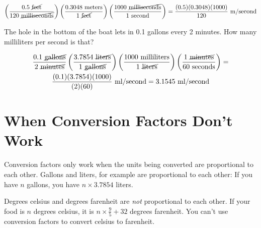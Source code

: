 \begin{multline*}
\left(\frac{0.5 \text{ \cancel{feet}}}{120 \text{ \cancel{milliseconds}}}\right) \left( \frac{0.3048 \text{ meters}}{1 \text{ \cancel{feet}}} \right) \left( \frac{ 1000 \text{ \cancel{milliseconds}}} {1 \text{ second}}\right) = \frac{(0.5)(0.3048)(1000)}{120}\text{ m/second}
\end{multline*}

\begin{Exercise}[title={Conversion Factors}, label=conversion_factors]

The hole in the bottom of the boat lets in 0.1 gallons every 2 minutes.  How many milliliters per second is that?
  
\end{Exercise}
\begin{Answer}[ref=onversion_factors]

  \begin{multline*}
    \frac{0.1 \text{ \cancel{gallons}}}{2 \text{ \cancel{minutes}}}
  \left( \frac{3.7854 \text{ \cancel{liters}}}{1 \text{ \cancel{gallons}}} \right)
  \left( \frac{1000 \text{ milliliters}}{1\text{ \cancel{liters}}}\right)
  \left( \frac{1 \text{ \cancel{minutes}}}{60 \text{ seconds}} \right) = \\
  \frac{(0.1)(3.7854)(1000)}{(2)(60)} \text{ ml/second} = 3.1545 \text{ ml/second}
  \end{multline*}
  
\end{Answer}

\section{When Conversion Factors Don't Work}

Conversion factors only work when the units being converted are
proportional to each other. Gallons and liters, for example are
proportional to each other: If you have $n$ gallons, you have $n
\times 3.7854$ liters.

Degrees celsius and degrees farenheit are \textit{not} proportional to
each other.  If your food is $n$ degrees celsius, it is $n \times
\frac{9}{5} + 32$ degrees farenheit.  You can't use conversion factors
to convert celsius to farenheit.
